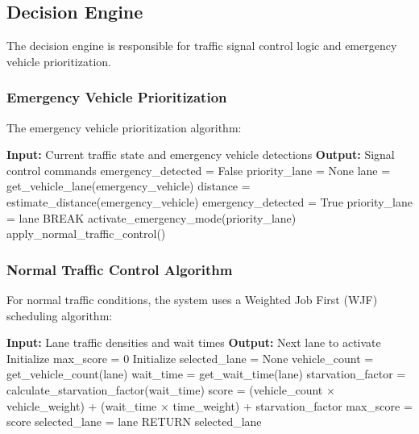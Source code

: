 \subsection{Decision Engine}

The decision engine is responsible for traffic signal control logic and emergency vehicle prioritization.

\subsubsection{Emergency Vehicle Prioritization}

The emergency vehicle prioritization algorithm:

\begin{algorithmic}[1]
\STATE \textbf{Input:} Current traffic state and emergency vehicle detections
\STATE \textbf{Output:} Signal control commands
\STATE 
\STATE emergency\_detected = False
\STATE priority\_lane = None
\STATE 
{}
    \STATE lane = get\_vehicle\_lane(emergency\_vehicle)
    \STATE distance = estimate\_distance(emergency\_vehicle)
    \STATE 
        \STATE emergency\_detected = True
        \STATE priority\_lane = lane
        \STATE BREAK
    \ENDIF
\ENDFOR
\STATE 
{}
    \STATE activate\_emergency\_mode(priority\_lane)
\ELSE
    \STATE apply\_normal\_traffic\_control()
\ENDIF
\end{algorithmic}

\subsubsection{Normal Traffic Control Algorithm}

For normal traffic conditions, the system uses a Weighted Job First (WJF) scheduling algorithm:

\begin{algorithmic}[1]
\STATE \textbf{Input:} Lane traffic densities and wait times
\STATE \textbf{Output:} Next lane to activate
\STATE 
\STATE Initialize max\_score = 0
\STATE Initialize selected\_lane = None
\STATE 
{}
    \STATE vehicle\_count = get\_vehicle\_count(lane)
    \STATE wait\_time = get\_wait\_time(lane)
    \STATE starvation\_factor = calculate\_starvation\_factor(wait\_time)
    \STATE 
    \STATE score = (vehicle\_count × vehicle\_weight) + (wait\_time × time\_weight) + starvation\_factor
    \STATE 
        \STATE max\_score = score
        \STATE selected\_lane = lane
    \ENDIF
\ENDFOR
\STATE 
\STATE RETURN selected\_lane
\end{algorithmic}

